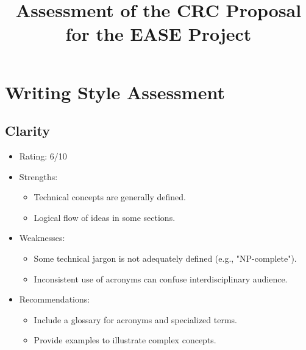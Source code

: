 \documentclass[11pt]{article}
\title{Assessment of the CRC Proposal for the EASE Project}
\author{}
\date{}
\begin{document}
\maketitle

\section{Writing Style Assessment}

\subsection{Clarity}
\begin{itemize}
    \item Rating: 6/10
    \item Strengths:
        \begin{itemize}
            \item Technical concepts are generally defined.
            \item Logical flow of ideas in some sections.
        \end{itemize}
    \item Weaknesses:
        \begin{itemize}
            \item Some technical jargon is not adequately defined (e.g., "NP-complete").
            \item Inconsistent use of acronyms can confuse interdisciplinary audience.
        \end{itemize}
    \item Recommendations:
        \begin{itemize}
            \item Include a glossary for acronyms and specialized terms.
            \item Provide examples to illustrate complex concepts.
        \end{itemize}
\end{itemize}
\end{document}
